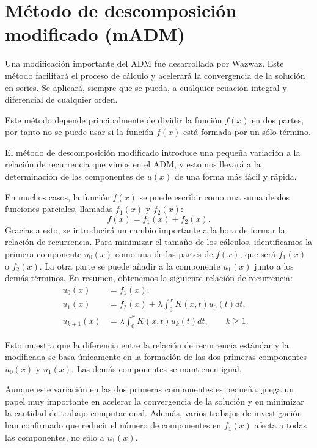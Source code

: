 \section{Método de descomposición modificado (mADM)}
Una modificación importante del ADM fue desarrollada por Wazwaz. Este método facilitará el proceso de cálculo y acelerará la convergencia de la solución en series. Se aplicará, siempre que se pueda, a cualquier ecuación integral y diferencial de cualquier orden.
\begin{observacion}
	Este método depende principalmente de dividir la función $f(x)$ en dos partes, por tanto no se puede usar si la función $f(x)$ está formada por un sólo término.
\end{observacion}
El método de descomposición modificado introduce una pequeña variación a la relación de recurrencia que vimos en el ADM, y esto nos llevará a la determinación de las componentes de $u(x)$ de una forma más fácil y rápida.

En muchos casos, la función $f(x)$ se puede escribir como una suma de dos funciones parciales, llamadas $f_1(x)$ y $f_2(x)$:
\begin{equation}
	f(x) = f_1(x) + f_2(x).
\end{equation}
Gracias a esto, se introducirá un cambio importante a la hora de formar la relación de recurrencia. Para minimizar el tamaño de los cálculos, identificamos la primera componente $u_0(x)$ como una de las partes de $f(x)$, que será $f_1(x)$ o $f_2(x)$. La otra parte se puede añadir a la componente $u_1(x)$ junto a los demás términos. En resumen, obtenemos la siguiente relación de recurrencia:
\begin{align}
	u_0(x) &= f_1(x),      &   \\
	u_{1}(x) &= f_2(x) + \lambda \int_{0}^{x} K(x,t)u_0(t)dt,    &  \\
	u_{k+1}(x) &= \lambda \int_{0}^{x} K(x,t)u_k(t)dt, \qquad k \geqslant 1.    &
\end{align}	
\begin{observacion}
	Esto muestra que la diferencia entre la relación de recurrencia estándar y la modificada se basa únicamente en la formación de las dos primeras componentes $u_0(x)$ y $u_1(x)$. Las demás componentes se mantienen igual.
\end{observacion}
Aunque este variación en las dos primeras componentes es pequeña, juega un papel muy importante en acelerar la convergencia de la solución y en minimizar la cantidad de trabajo computacional. Además, varios trabajos de investigación han confirmado que reducir el número de componentes en $f_1(x)$ afecta a todas las componentes, no sólo a $u_1(x)$.

